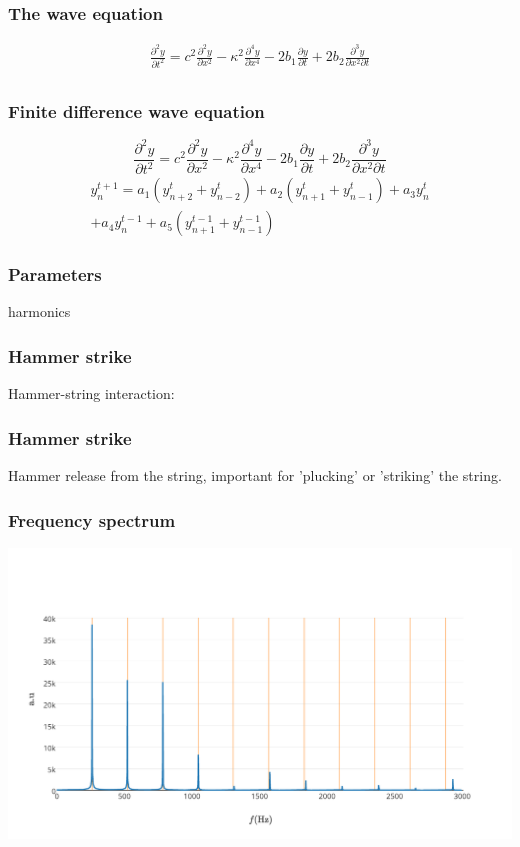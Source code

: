 \documentclass{beamer}
\begin{document}
\begin{frame}\frametitle{The wave equation}
	\begin{gather*}
	\frac{\partial^2 y}{\partial t^2} = c^2\frac{\partial^2 y}{\partial x^2}-\kappa^2\frac{\partial^4y}{\partial x^4}-2b_1\frac{\partial y}{\partial t} + 2b_2 \frac{\partial^3y}{\partial x^2\partial t}\\
\end{gather*}
\end{frame}

\begin{frame}\frametitle{Finite difference wave equation}
	\begin{equation*}
	\frac{\partial^2 y}{\partial t^2} = c^2\frac{\partial^2 y}{\partial x^2}-\kappa^2\frac{\partial^4y}{\partial x^4}-2b_1\frac{\partial y}{\partial t} + 2b_2 \frac{\partial^3y}{\partial x^2\partial t}
	\end{equation*}
	\begin{gather*}
	    y_n^{t+1} 
	    = a_1\left(y_{n+2}^t+y_{n-2}^t\right)+a_2\left(y_{n+1}^t+y_{n-1}^t\right)+a_3y_n^t\\
	    +a_4y_n^{t-1}+a_5\left(y_{n+1}^{t-1}+y_{n-1}^{t-1}\right)
    \end{gather*}
\end{frame}

\begin{frame}\frametitle{Parameters}
    harmonics
\end{frame}

\begin{frame}\frametitle{Hammer strike}
Hammer-string interaction:\\
\end{frame}

\begin{frame}\frametitle{Hammer strike}
Hammer release from the string, important for 'plucking' or 'striking' the string.
\end{frame}

\begin{frame}\frametitle{Frequency spectrum}
\begin{minipage}{1\textwidth}
		\includegraphics[width=\textwidth]{images/freq.pdf}
	\end{minipage}
\end{frame}
\end{document}
